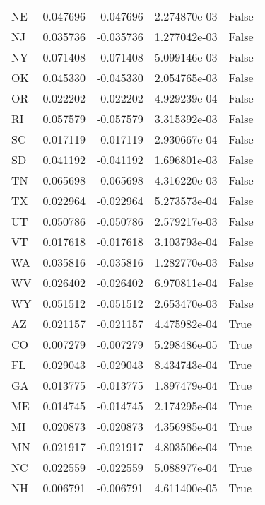\begin{table}
\begin{tabular}{lrrrl}
      NE &   0.047696 & -0.047696 &   2.274870e-03 &         False \\
      NJ &   0.035736 & -0.035736 &   1.277042e-03 &         False \\
      NY &   0.071408 & -0.071408 &   5.099146e-03 &         False \\
      OK &   0.045330 & -0.045330 &   2.054765e-03 &         False \\
      OR &   0.022202 & -0.022202 &   4.929239e-04 &         False \\
      RI &   0.057579 & -0.057579 &   3.315392e-03 &         False \\
      SC &   0.017119 & -0.017119 &   2.930667e-04 &         False \\
      SD &   0.041192 & -0.041192 &   1.696801e-03 &         False \\
      TN &   0.065698 & -0.065698 &   4.316220e-03 &         False \\
      TX &   0.022964 & -0.022964 &   5.273573e-04 &         False \\
      UT &   0.050786 & -0.050786 &   2.579217e-03 &         False \\
      VT &   0.017618 & -0.017618 &   3.103793e-04 &         False \\
      WA &   0.035816 & -0.035816 &   1.282770e-03 &         False \\
      WV &   0.026402 & -0.026402 &   6.970811e-04 &         False \\
      WY &   0.051512 & -0.051512 &   2.653470e-03 &         False \\
      AZ &   0.021157 & -0.021157 &   4.475982e-04 &          True \\
      CO &   0.007279 & -0.007279 &   5.298486e-05 &          True \\
      FL &   0.029043 & -0.029043 &   8.434743e-04 &          True \\
      GA &   0.013775 & -0.013775 &   1.897479e-04 &          True \\
      ME &   0.014745 & -0.014745 &   2.174295e-04 &          True \\
      MI &   0.020873 & -0.020873 &   4.356985e-04 &          True \\
      MN &   0.021917 & -0.021917 &   4.803506e-04 &          True \\
      NC &   0.022559 & -0.022559 &   5.088977e-04 &          True \\
      NH &   0.006791 & -0.006791 &   4.611400e-05 &          True \\

\end{tabular}
\end{table}
